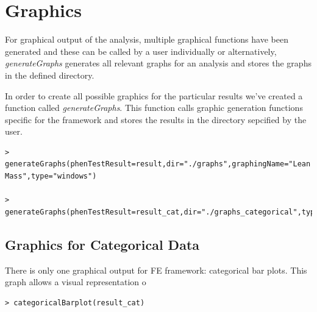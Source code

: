 \documentclass[12pt,a4paper]{article}
\begin{document}
\section{Graphics}
For graphical output of the analysis, multiple graphical functions have been generated and these can be called by a user individually or alternatively, 
\textit{generateGraphs} generates all relevant graphs for an analysis and stores the graphs in the defined directory. 

In order to create all possible graphics for the particular results we've created a function called \textit{generateGraphs}. This function calls graphic generation functions specific for the framework and stores the results in the directory sepcified by the user.


\begingroup
    \fontsize{8pt}{12pt}\selectfont
\begin{verbatim}
> generateGraphs(phenTestResult=result,dir="./graphs",graphingName="Lean Mass",type="windows")

> generateGraphs(phenTestResult=result_cat,dir="./graphs_categorical",type="windows")
\end{verbatim}
\endgroup 

\subsection{Graphics for Categorical Data}
There is only one graphical output for FE framework: categorical bar plots. This graph allows a visual representation o 

\begingroup
    \fontsize{8pt}{12pt}\selectfont
\begin{verbatim}
> categoricalBarplot(result_cat)
\end{verbatim}
\endgroup 
\end{document}
